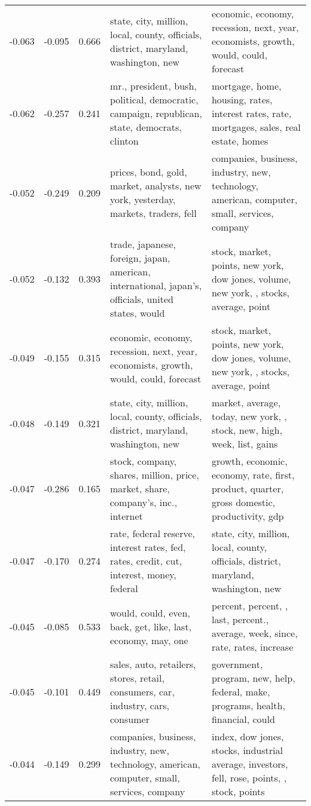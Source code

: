 \begin{tabular}{cccp{5cm}p{5cm}}
-0.063 & -0.095 & 0.666 & state, city, million, local, county, officials, district, maryland, washington, new & economic, economy, recession, next, year, economists, growth, would, could, forecast \\
-0.062 & -0.257 & 0.241 & mr., president, bush, political, democratic, campaign, republican, state, democrats, clinton & mortgage, home, housing, rates, interest rates, rate, mortgages, sales, real estate, homes \\
-0.052 & -0.249 & 0.209 & prices, bond, gold, market, analysts, new york, yesterday, markets, traders, fell & companies, business, industry, new, technology, american, computer, small, services, company \\
-0.052 & -0.132 & 0.393 & trade, japanese, foreign, japan, american, international, japan's, officials, united states, would & stock, market, points, new york, dow jones, volume, new york, , stocks, average, point \\
-0.049 & -0.155 & 0.315 & economic, economy, recession, next, year, economists, growth, would, could, forecast & stock, market, points, new york, dow jones, volume, new york, , stocks, average, point \\
-0.048 & -0.149 & 0.321 & state, city, million, local, county, officials, district, maryland, washington, new & market, average, today, new york, , stock, new, high, week, list, gains \\
-0.047 & -0.286 & 0.165 & stock, company, shares, million, price, market, share, company's, inc., internet & growth, economic, economy, rate, first, product, quarter, gross domestic, productivity, gdp \\
-0.047 & -0.170 & 0.274 & rate, federal reserve, interest rates, fed, rates, credit, cut, interest, money, federal & state, city, million, local, county, officials, district, maryland, washington, new \\
-0.045 & -0.085 & 0.533 & would, could, even, back, get, like, last, economy, may, one & percent, percent, , last, percent., average, week, since, rate, rates, increase \\
-0.045 & -0.101 & 0.449 & sales, auto, retailers, stores, retail, consumers, car, industry, cars, consumer & government, program, new, help, federal, make, programs, health, financial, could \\
-0.044 & -0.149 & 0.299 & companies, business, industry, new, technology, american, computer, small, services, company & index, dow jones, stocks, industrial average, investors, fell, rose, points, , stock, points \\

\end{tabular}
